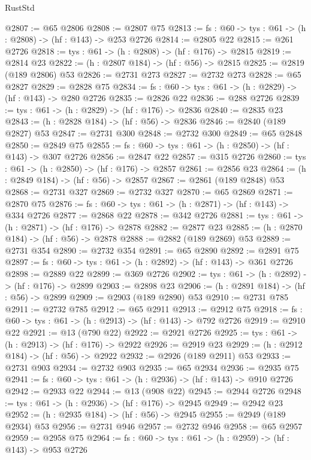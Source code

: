 \begin{lexlean}{RustStd}
\begin{coremodule}
@2807 := @65 @2806
@2808 := @2807 @75
@2813 := {fs : @60} -> {tys : @61} -> (h : @2808) -> (hf : @143) -> @253 @2726
@2814 := @2805 @22
@2815 := @261 @2726
@2818 := {tys : @61} -> (h : @2808) -> (hf : @176) -> @2815
@2819 := @2814 @23
@2822 := (h : @2807 @184) -> (hf : @56) -> @2815
@2825 := @2819 (@189 @2806) @53
@2826 := @2731 @273
@2827 := @2732 @273
@2828 := @65 @2827
@2829 := @2828 @75
@2834 := {fs : @60} -> {tys : @61} -> (h : @2829) -> (hf : @143) -> @280 @2726
@2835 := @2826 @22
@2836 := @288 @2726
@2839 := {tys : @61} -> (h : @2829) -> (hf : @176) -> @2836
@2840 := @2835 @23
@2843 := (h : @2828 @184) -> (hf : @56) -> @2836
@2846 := @2840 (@189 @2827) @53
@2847 := @2731 @300
@2848 := @2732 @300
@2849 := @65 @2848
@2850 := @2849 @75
@2855 := {fs : @60} -> {tys : @61} -> (h : @2850) -> (hf : @143) -> @307 @2726
@2856 := @2847 @22
@2857 := @315 @2726
@2860 := {tys : @61} -> (h : @2850) -> (hf : @176) -> @2857
@2861 := @2856 @23
@2864 := (h : @2849 @184) -> (hf : @56) -> @2857
@2867 := @2861 (@189 @2848) @53
@2868 := @2731 @327
@2869 := @2732 @327
@2870 := @65 @2869
@2871 := @2870 @75
@2876 := {fs : @60} -> {tys : @61} -> (h : @2871) -> (hf : @143) -> @334 @2726
@2877 := @2868 @22
@2878 := @342 @2726
@2881 := {tys : @61} -> (h : @2871) -> (hf : @176) -> @2878
@2882 := @2877 @23
@2885 := (h : @2870 @184) -> (hf : @56) -> @2878
@2888 := @2882 (@189 @2869) @53
@2889 := @2731 @354
@2890 := @2732 @354
@2891 := @65 @2890
@2892 := @2891 @75
@2897 := {fs : @60} -> {tys : @61} -> (h : @2892) -> (hf : @143) -> @361 @2726
@2898 := @2889 @22
@2899 := @369 @2726
@2902 := {tys : @61} -> (h : @2892) -> (hf : @176) -> @2899
@2903 := @2898 @23
@2906 := (h : @2891 @184) -> (hf : @56) -> @2899
@2909 := @2903 (@189 @2890) @53
@2910 := @2731 @785
@2911 := @2732 @785
@2912 := @65 @2911
@2913 := @2912 @75
@2918 := {fs : @60} -> {tys : @61} -> (h : @2913) -> (hf : @143) -> @792 @2726
@2919 := @2910 @22
@2921 := @13 (@790 @22)
@2922 := @2921 @2726
@2925 := {tys : @61} -> (h : @2913) -> (hf : @176) -> @2922
@2926 := @2919 @23
@2929 := (h : @2912 @184) -> (hf : @56) -> @2922
@2932 := @2926 (@189 @2911) @53
@2933 := @2731 @903
@2934 := @2732 @903
@2935 := @65 @2934
@2936 := @2935 @75
@2941 := {fs : @60} -> {tys : @61} -> (h : @2936) -> (hf : @143) -> @910 @2726
@2942 := @2933 @22
@2944 := @13 (@908 @22)
@2945 := @2944 @2726
@2948 := {tys : @61} -> (h : @2936) -> (hf : @176) -> @2945
@2949 := @2942 @23
@2952 := (h : @2935 @184) -> (hf : @56) -> @2945
@2955 := @2949 (@189 @2934) @53
@2956 := @2731 @946
@2957 := @2732 @946
@2958 := @65 @2957
@2959 := @2958 @75
@2964 := {fs : @60} -> {tys : @61} -> (h : @2959) -> (hf : @143) -> @953 @2726

\end{coremodule}
\end{lexlean}
